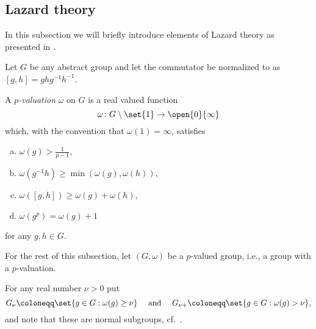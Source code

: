 

\subsection{Lazard theory}%
\label{subsec:Laz-theory}

In this subsection we will briefly introduce elements of Lazard theory as presented in \cite{Sch}.

Let $G$ be any abstract group and let the commutator be normalized to as $[g,h]=ghg^{-1}h^{-1}$.

\begin{definition}
  A \emph{$p$-valuation} $\omega$ on $G$ is a real valued function
  \begin{equation*}
    \omega \colon G \setminus \set{1} \to \open{0}{\infty}
  \end{equation*}%
  which, with the convention that $\omega(1)=\infty$, satisfies
  \begin{enumerate}[(a)]
    \item $\omega(g) > \tfrac{1}{p-1}$,
    \item $\omega(g^{-1}h) \geq \min(\omega(g),\omega(h))$,
    \item $\omega([g,h]) \geq \omega(g) + \omega(h)$,
    \item $\omega(g^p) = \omega(g)+1$
  \end{enumerate}
  for any $g,h\in G$.
\end{definition}

For the rest of this subsection, let $(G,\omega)$ be a $p$-valued group, i.e., a group with a $p$-valuation.

For any real number $\nu>0$ put
\begin{equation*}
  G_{\nu} \coloneqq \set{g\in G : \omega(g)\geq \nu} \quad \text{ and } \quad G_{\nu+} \coloneqq \set{g\in G : \omega(g)>\nu},
\end{equation*}%
%
%
and note that these are normal subgroups, cf.\ \cite[Sect.~23]{Sch}.

